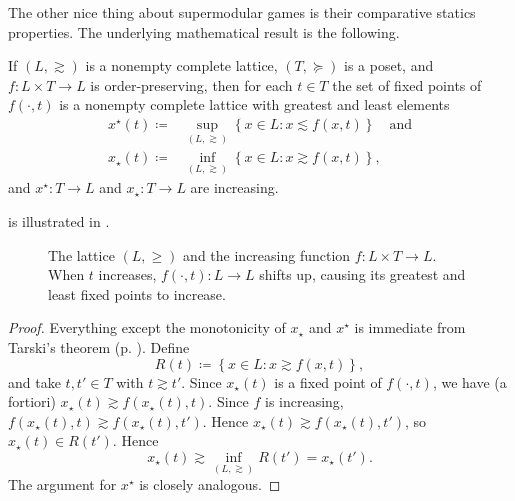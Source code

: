 \documentclass[11pt,letterpaper,reqno,oneside]{article}
\begin{document}
The other nice thing about supermodular games is their comparative statics properties. The underlying mathematical result is the following.

\begin{proposition}
	\label{proposition:Tarski_Topkis}
	If $(L,\gtrsim)$ is a nonempty complete lattice, $(T,\succeq)$ is a poset, and $f : L \times T \to L$ is order-preserving, then for each $t \in T$ the set of fixed points of $f(\cdot,t)$ is a nonempty complete lattice with greatest and least elements
	\begin{align*}
		x^\star(t) \coloneqq{}& \sup_{(L,\gtrsim)} \left\{ x \in L : x \lesssim f(x,t) \right\}
		\quad\text{and}
		\\
		x_\star(t) \coloneqq{}& \inf_{(L,\gtrsim)} \left\{ x \in L : x \gtrsim f(x,t) \right\} ,
	\end{align*}
	and $x^\star : T \to L$ and $x_\star : T \to L$ are increasing.
\end{proposition}

 is illustrated in .
%
\begin{figure}
	\centering
	
	\caption{The lattice $(L,\geq)$ and the increasing function $f : L \times T \to L$. When $t$ increases, $f(\cdot,t) : L \to L$ shifts up, causing its greatest and least fixed points to increase.}
	\label{fig:tarski_fp_shift}
\end{figure}

\begin{proof}
	Everything except the monotonicity of $x_\star$ and $x^\star$ is immediate from Tarski's theorem (p. \pageref{theorem:Tarski}). Define
	\begin{equation*}
		R(t) \coloneqq \left\{ x \in L : x \gtrsim f(x,t) \right\} ,
	\end{equation*}
	and take $t,t' \in T$ with $t \gtrsim t'$. Since $x_\star(t)$ is a fixed point of $f(\cdot,t)$, we have (a fortiori) $x_\star(t) \gtrsim f( x_\star(t), t )$. Since $f$ is increasing, $f( x_\star(t), t ) \gtrsim f( x_\star(t), t' )$. Hence $x_\star(t) \gtrsim f( x_\star(t), t' )$, so $x_\star(t) \in R(t')$. Hence
	\begin{equation*}
		x_\star(t) \gtrsim \inf_{(L,\gtrsim)} R(t') = x_\star(t') .
	\end{equation*}
	The argument for $x^\star$ is closely analogous.
\end{proof}
\end{document}
